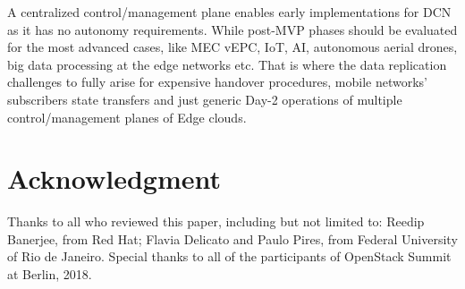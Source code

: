 \documentclass[conference]{IEEEtran}
\begin{document}
A centralized control/management plane enables early implementations for DCN as
it has no autonomy requirements. While post-MVP phases should be evaluated for
the most advanced cases, like MEC vEPC, IoT, AI, autonomous aerial drones, big
data processing at the edge networks etc. That is where the data replication
challenges to fully arise for expensive handover procedures, mobile networks'
subscribers state transfers and just generic Day-2 operations of multiple
control/management planes of Edge clouds.

\section*{Acknowledgment}
Thanks to all who reviewed this paper, including but not limited to:
Reedip Banerjee, from Red Hat; Flavia Delicato and Paulo Pires, from Federal
University of Rio de Janeiro. Special thanks to all of the participants of
OpenStack Summit at Berlin, 2018.
\end{document}
